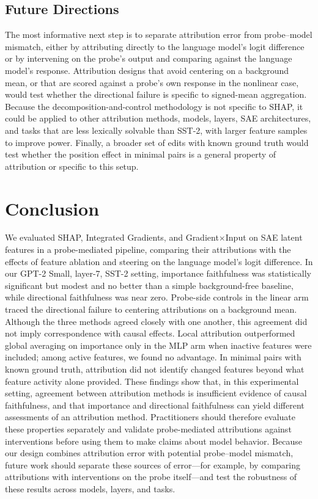 \subsection{Future Directions}
The most informative next step is to separate attribution error from probe--model mismatch, either by attributing directly to the language model's logit difference or by intervening on the probe's output and comparing against the language model's response. Attribution designs that avoid centering on a background mean, or that are scored against a probe's own response in the nonlinear case, would test whether the directional failure is specific to signed-mean aggregation. Because the decomposition-and-control methodology is not specific to SHAP, it could be applied to other attribution methods, models, layers, SAE architectures, and tasks that are less lexically solvable than SST-2, with larger feature samples to improve power. Finally, a broader set of edits with known ground truth would test whether the position effect in minimal pairs is a general property of attribution or specific to this setup.



\section{Conclusion}
We evaluated SHAP, Integrated Gradients, and Gradient$\times$Input on SAE latent features in a probe-mediated pipeline, comparing their attributions with the effects of feature ablation and steering on the language model’s logit difference. In our GPT-2 Small, layer-7, SST-2 setting, importance faithfulness was statistically significant but modest and no better than a simple background-free baseline, while directional faithfulness was near zero. Probe-side controls in the linear arm traced the directional failure to centering attributions on a background mean. Although the three methods agreed closely with one another, this agreement did not imply correspondence with causal effects. Local attribution outperformed global averaging on importance only in the MLP arm when inactive features were included; among active features, we found no advantage. In minimal pairs with known ground truth, attribution did not identify changed features beyond what feature activity alone provided. These findings show that, in this experimental setting, agreement between attribution methods is insufficient evidence of causal faithfulness, and that importance and directional faithfulness can yield different assessments of an attribution method. Practitioners should therefore evaluate these properties separately and validate probe-mediated attributions against interventions before using them to make claims about model behavior. Because our design combines attribution error with potential probe–model mismatch, future work should separate these sources of error—for example, by comparing attributions with interventions on the probe itself—and test the robustness of these results across models, layers, and tasks.


